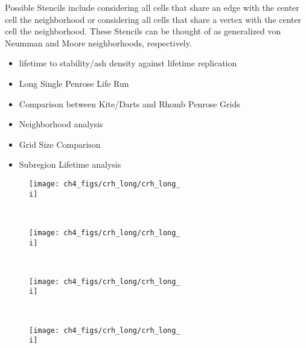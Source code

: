 Possible Stencils include considering all cells that share an edge with the center cell the neighborhood or considering all cells that share a vertex with the center cell the neighborhood. These Stencils can be thought of as generalized von Neumman and Moore neighborhoods, respectively.

\begin{itemize}
\item lifetime to stability/ash density against lifetime replication
\item Long Single Penrose Life Run
\item Comparison between Kite/Darts and Rhomb Penrose Grids
\item Neighborhood analysis

\item Grid Size Comparison

\item Subregion Lifetime analysis
\end{itemize}


 
        \begin{subfigure}[t]{0.\textwidth}
    \centering
    \texttt{[image: ch4\_figs/crh\_long/crh\_long\_\\i]}
    \end{subfigure} 
    ~
    \begin{subfigure}[t]{0.2\textwidth}
    \centering
    \texttt{[image: ch4\_figs/crh\_long/crh\_long\_\\i]}
    \end{subfigure}
    ~
    \begin{subfigure}[t]{0.2\textwidth}
    \centering
    \texttt{[image: ch4\_figs/crh\_long/crh\_long\_\\i]}
    \end{subfigure}
    ~
    \begin{subfigure}[t]{0.2\textwidth}
    \centering
    \texttt{[image: ch4\_figs/crh\_long/crh\_long\_\\i]}
    \end{subfigure}






\iffalse
\multido{\i=0+1}{66}{
    \subcaptionbox{\i}{\texttt{[image: ch4\_figs/crh\_long/crh\_long\_\\i]}}&
    \subcaptionbox{\i}{\texttt{[image: ch4\_figs/crh\_long/crh\_long\_\\i]}}&
    \subcaptionbox{\i}{\texttt{[image: ch4\_figs/crh\_long/crh\_long\_\\i]}}&
    \subcaptionbox{\i}{\texttt{[image: ch4\_figs/crh\_long/crh\_long\_\\i]}}\\
}
\fi

